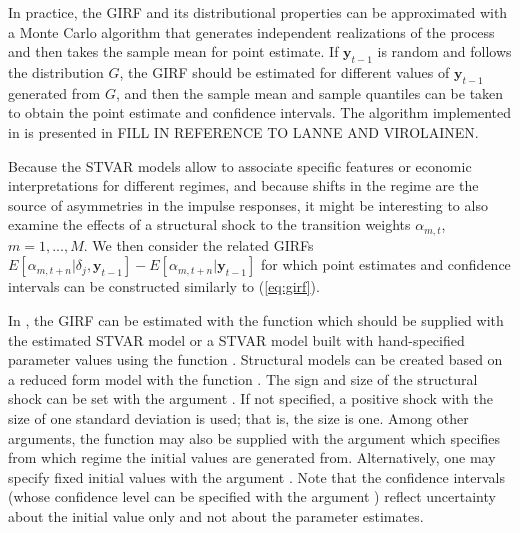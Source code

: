 \documentclass[nojss]{jss}
\begin{document}
In practice, the GIRF and its distributional properties can be approximated with a Monte Carlo algorithm that generates independent realizations of the process and then takes the sample mean for point estimate. If $\boldsymbol{y}_{t-1}$ is random and follows the distribution $G$, the GIRF should be estimated for different values of $\boldsymbol{y}_{t-1}$ generated from $G$, and then the sample mean and sample quantiles can be taken to obtain the point estimate and confidence intervals. The algorithm implemented in  is presented in FILL IN REFERENCE TO LANNE AND VIROLAINEN.

Because the STVAR models allow to associate specific features or economic interpretations for different regimes, and because shifts in the regime are the source of asymmetries in the impulse responses, it might be interesting to also examine the effects of a structural shock to the transition weights $\alpha_{m,t}$, $m=1,...,M$. We then consider the related GIRFs $E[\alpha_{m,t+n}|\delta_j,\boldsymbol{y}_{t-1}] - E[\alpha_{m,t+n}|\boldsymbol{y}_{t-1}]$ for which point estimates and confidence intervals can be constructed similarly to (\ref{eq:girf}).

In , the GIRF can be estimated with the function  which should be supplied with the estimated STVAR model or a STVAR model built with hand-specified parameter values using the function . Structural models can be created based on a reduced form model with the function . The sign and size of the structural shock can be set with the argument . If not specified, a positive shock with the size of one standard deviation is used; that is, the size is one. Among other arguments, the function may also be supplied with the argument  which specifies from which regime the initial values are generated from. Alternatively, one may specify fixed initial values with the argument . Note that the confidence intervals (whose confidence level can be specified with the argument ) reflect uncertainty about the initial value only and not about the parameter estimates.
\end{document}
